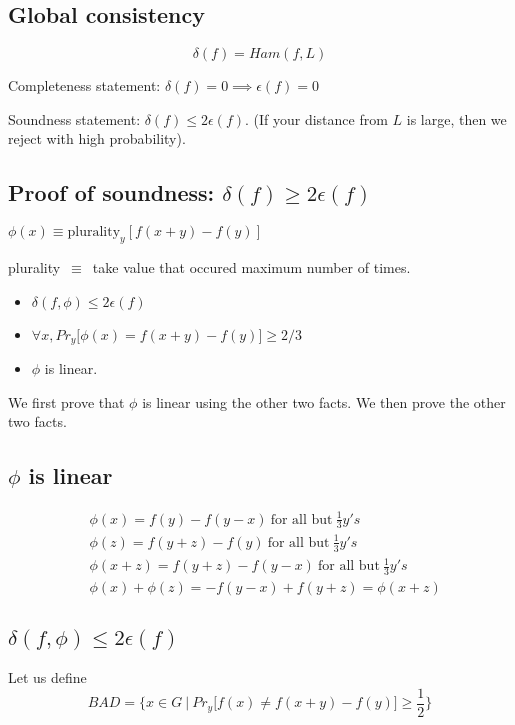 \subsection{Global consistency}
$$\delta(f) = Ham(f, L)$$

Completeness statement: $\delta(f) = 0 \implies \epsilon(f) = 0$

Soundness statement: $\delta(f) \leq 2 \epsilon(f)$. (If your distance from $L$ is large,
then we reject with high probability).

\subsection{Proof of soundness: $\delta(f) \geq 2 \epsilon(f)$}
$\phi(x) \equiv \text{plurality}_y [f(x + y) - f(y)]$

plurality~$\equiv$~take value that occured maximum number of times.

\begin{itemize}
    \item $\delta(f, \phi) \leq 2 \epsilon(f)$
    \item $\forall x, Pr_y \big [ \phi(x) = f(x + y) - f(y) \big] \geq 2/3$
    \item  $\phi$ is linear.
\end{itemize}

We first prove that $\phi$ is linear using the other two facts. We then
prove the other two facts.

\subsection{$\phi$ is linear}
\begin{align*}
    &\phi(x) = f(y) - f(y - x)~\text{for all but}~\frac{1}{3} y's \\
    &\phi(z) = f(y + z) - f(y)~\text{for all but}~\frac{1}{3} y's \\
    &\phi(x + z) = f(y + z) - f(y - x)~\text{for all but}~\frac{1}{3} y's \\
    &\phi(x) + \phi(z) = -f (y - x) + f(y + z) = \phi(x + z)
\end{align*}

\subsection{$\delta(f, \phi) \leq 2 \epsilon(f)$}

Let us define 
$$
BAD = \bigg\{ x \in G ~\bigg\vert~ Pr_y \big [ f(x) \neq f(x + y) - f(y) \big ] \geq \frac{1}{2} \bigg\}
$$



